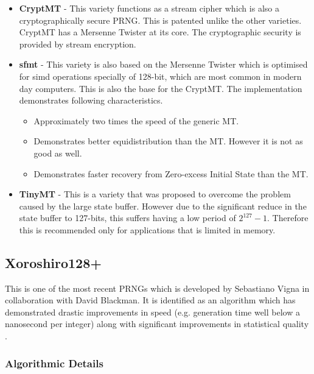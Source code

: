 \begin{itemize}
    \item \textbf{CryptMT} - This variety functions as a stream cipher which is also a cryptographically secure PRNG. This is patented unlike the other varieties. CryptMT has a Mersenne Twister at its core. The cryptographic security is provided by stream encryption.
    
    \item \textbf{\acrfull{sfmt}} - This variety is also based on the Mersenne Twister which is optimised for \acrfull{simd} operations specially of 128-bit, which are most common in modern day computers. This is also the base for the CryptMT. The implementation demonstrates following characteristics.
    
    \begin{itemize}
        \item Approximately two times the speed of the generic MT.
        \item Demonstrates better equidistribution than the MT. However it is not as good as \acrfull{well}.
        \item Demonstrates faster recovery from Zero-excess Initial State than the MT.
    \end{itemize}
    
    \item \textbf{TinyMT} - This is a variety that was proposed to overcome the problem caused by the large state buffer. However due to the significant reduce in the state buffer to 127-bits, this suffers having a low period of $2^{127}-1$. Therefore this is recommended only for applications that is limited in memory.
\end{itemize}

\subsection{Xoroshiro128+}

This is one of the most recent PRNGs which is developed by  Sebastiano Vigna in collaboration with David Blackman. It is identified as an algorithm which has demonstrated drastic improvements in speed (e.g. generation time well below a nanosecond per integer) along with significant improvements in statistical quality \cite{rep_slprng_vigna_blackman}.

\subsubsection{Algorithmic Details}

